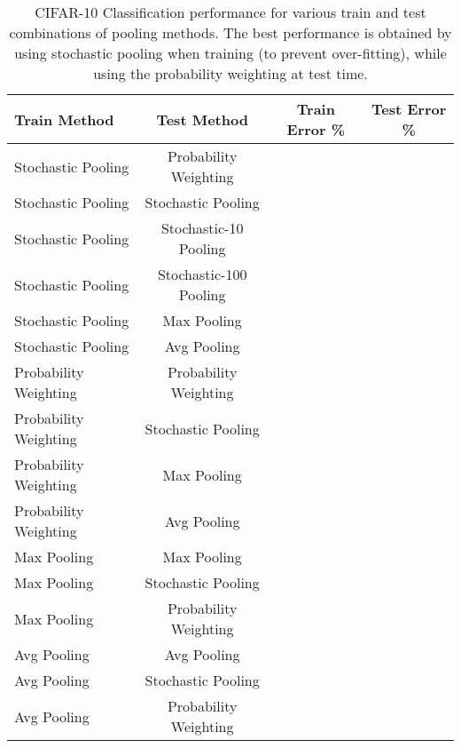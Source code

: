 \documentclass{article} \usepackage{nips12submit_e,times}
\begin{document}
\begin{table}[h!]
\small
\vspace*{-3mm}
\begin{center}
\begin{tabular}{|l|c|c|c|}
  \hline
  Train Method & Test Method & Train Error \% & Test Error \% \\
  \hline\hline
  Stochastic Pooling & Probability Weighting &  &  \\
Stochastic Pooling & Stochastic Pooling &  &  \\
  Stochastic Pooling & Stochastic-10 Pooling &  &  \\
  Stochastic Pooling & Stochastic-100 Pooling &  &  \\
Stochastic Pooling & Max Pooling &  &  \\ Stochastic Pooling & Avg Pooling &  &  \\ \hline\hline Probability Weighting & Probability Weighting &  &  \\
Probability Weighting & Stochastic Pooling &  &  \\
Probability Weighting & Max Pooling &  &  \\
Probability Weighting & Avg Pooling &  &  \\
  \hline\hline Max Pooling & Max Pooling &  &  \\
  Max Pooling & Stochastic Pooling &  &  \\
  Max Pooling & Probability Weighting &  &  \\
  \hline\hline Avg Pooling & Avg Pooling &  &  \\
  Avg Pooling & Stochastic Pooling &  &  \\
  Avg Pooling & Probability Weighting &  &  \\
  \hline
\end{tabular}
\vspace*{-2mm}
\caption{CIFAR-10 Classification performance for various train and
  test combinations of pooling methods. The best performance is
  obtained by using stochastic pooling when training (to prevent
  over-fitting), while using the probability weighting at test time.}
\label{tab:combos}
\end{center}
\vspace*{-9mm}
\end{table}
\end{document}
